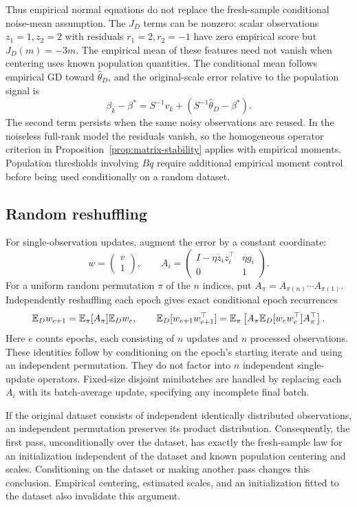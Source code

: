 Thus empirical normal equations do not replace the fresh-sample conditional
noise-mean assumption. The $J_D$ terms can be nonzero: scalar observations
$z_1 = 1,z_2 = 2$ with residuals $r_1 = 2,r_2 = -1$ have zero empirical score
but $J_D(m) = -3m$. The empirical mean of these features need not vanish when
centering uses known population quantities. The conditional mean follows
empirical GD toward $\widehat\theta_D$, and the original-scale error relative to
the population signal is
\[
 \beta_k - \beta^* = S^{-1}v_k + (S^{-1}\widehat\theta_D - \beta^*).
\]
The second term persists when the same noisy observations are reused. In the
noiseless full-rank model the residuals vanish, so the homogeneous operator
criterion in Proposition~\ref{prop:matrix-stability} applies with empirical
moments. Population thresholds involving $Bq$ require additional empirical
moment control before being used conditionally on a random dataset.

\subsection{Random reshuffling}

For single-observation updates, augment the error by a constant coordinate:
\[
 w = \begin{pmatrix}
      v \\
      1
     \end{pmatrix},\qquad A_i
   = \begin{pmatrix}
      I - \eta z_i z_i^\top & \eta g_i \\
      0                     & 1
     \end{pmatrix}.
\]
For a uniform random permutation $\pi$ of the $n$ indices, put
$A_\pi = A_{\pi(n)}\cdots A_{\pi(1)}$. Independently reshuffling each epoch
gives exact conditional epoch recurrences
\[
 \mathbb{E}_Dw_{e+1} = \mathbb{E}_\pi[A_\pi]\mathbb{E}_Dw_e,\qquad \mathbb{E}_D[w_{e+1}w_{e+1}^\top]
             = \mathbb{E}_\pi\left[ A_\pi\mathbb{E}_D[w_ew_e^\top]A_\pi^\top \right].
\]
Here $e$ counts epochs, each consisting of $n$ updates and $n$ processed
observations. These identities follow by conditioning on the epoch's starting
iterate and using an independent permutation. They do not factor into $n$
independent single-update operators. Fixed-size disjoint minibatches are handled
by replacing each $A_i$ with its batch-average update, specifying any incomplete
final batch.

If the original dataset consists of independent identically distributed
observations, an independent permutation preserves its product distribution.
Consequently, the first pass, unconditionally over the dataset, has exactly the
fresh-sample law for an initialization independent of the dataset and known
population centering and scales. Conditioning on the dataset or making another
pass changes this conclusion. Empirical centering, estimated scales, and an
initialization fitted to the dataset also invalidate this argument.

